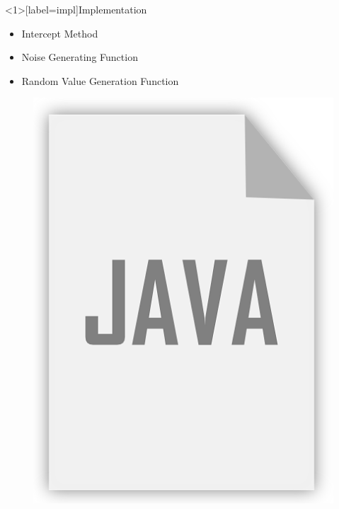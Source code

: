 \documentclass[aspectratio=169]{beamer}
[aspectratio=169] %
\begin{document}
\begin{frame}<1>[label=impl]{Implementation}
  \begin{minipage}{0.49\textwidth} 
    \begin{itemize}
      \item Intercept Method
      \pause
      \item Noise Generating Function
      \pause
      \item Random Value Generation Function
    \end{itemize}
  \end{minipage}
  \hfill
  \begin{minipage}{0.49\textwidth} 
    \begin{figure}
      \centering
      \includegraphics[height=0.5\textheight]{figures/java.png}
    \end{figure}
  \end{minipage}
\end{frame}
\end{document}
